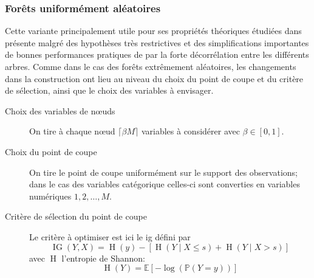 \subsubsection{Forêts uniformément aléatoires}

Cette variante principalement utile pour ses propriétés théoriques étudiées dans \citet{Ciss2013} présente malgré des hypothèses très restrictives et des simplifications importantes de bonnes performances pratiques de par la forte décorrélation entre les différents arbres. Comme dans le cas des forêts extrêmement aléatoires, les changements dans la construction ont lieu au niveau du choix du point de coupe et du critère de sélection, ainsi que le choix des variables à envisager.

\begin{description}
    \item[Choix des variables de nœuds] On tire à chaque nœud $ \lceil \beta M \rceil $ variables à considérer avec $\beta \in [0,1]$.
    \item[Choix du point de coupe] On tire le point de coupe uniformément sur le support des observations; dans le cas des variables catégorique celles-ci sont converties en variables numériques $1,2,\dotsc,M$.
    \item[Critère de sélection du point de coupe] Le critère à optimiser est ici le \ac{ig} défini par 
    \begin{equation*}
        \operatorname{IG} (Y,X) = \operatorname{H} (y) - \left[ \operatorname{H}(Y \mid X \leq s ) + \operatorname{H}(Y \mid X > s ) \right]
    \end{equation*}
    avec $\operatorname{H}$ l'entropie de Shannon:
    \begin{equation*}
        \operatorname{H} (Y) = \mathbb{E} \left[ -\log \left( \mathbb{P} ( Y = y )  \right) \right]
    \end{equation*}
\end{description}

